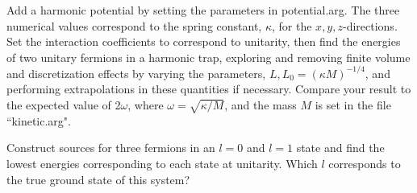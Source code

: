 \begin{prob}
 Add a harmonic potential by setting the parameters in potential.arg. The three numerical values correspond to the spring constant, $\kappa$, for the $x,y,z$-directions. Set the interaction coefficients to correspond to unitarity, then find the energies of two unitary fermions in a harmonic trap, exploring and removing finite volume and discretization effects by varying the parameters, $L,L_0=\left(\kappa M\right)^{-1/4}$, and performing extrapolations in these quantities if necessary. Compare your result to the expected value of 2$\omega$, where $\omega = \sqrt{\kappa/M}$, and the mass $M$ is set in the file ``kinetic.arg". 
\end{prob}

\begin{prob}
Construct sources for three fermions in an $l=0$ and $l=1$ state and find the lowest energies corresponding to each state at unitarity. Which $l$ corresponds to the true ground state of this system?
\end{prob}









